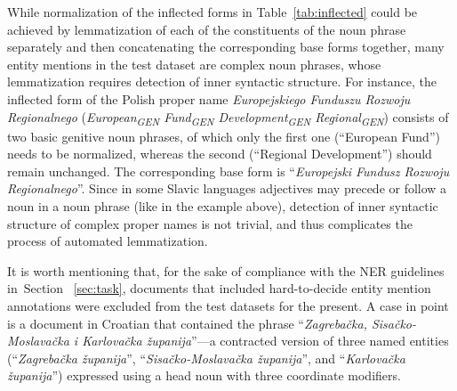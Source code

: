 \documentclass[11pt]{article}
\begin{document}
While normalization of the inflected forms in Table~\ref{tab:inflected} could be achieved
by lemmatization of each of the constituents of the noun phrase separately and then concatenating
the corresponding base forms together, many entity mentions in the test dataset are complex noun phrases, 
whose lemmatization requires detection of inner syntactic structure. For instance, the inflected form 
of the Polish proper name \textit{Europejskiego Funduszu Rozwoju Regionalnego} 
(\emph{European\textsubscript{GEN} Fund\textsubscript{GEN} Development\textsubscript{GEN} Regional\textsubscript{GEN}}) consists of two basic genitive 
noun phrases, of which only the first one (``European Fund'') needs to be normalized, whereas the 
second (``Regional Development'') should remain unchanged. The corresponding base form
is ``\textit{Europejski Fundusz Rozwoju Regionalnego}''. Since in some Slavic languages
adjectives may precede or follow a noun in a noun phrase (like in the example above), 
detection of inner syntactic structure of complex proper names is not trivial, and thus complicates
the process of automated lemmatization.

It is worth mentioning that, for the sake of compliance with the NER guidelines in~Section
~\ref{sec:task}, documents that included hard-to-decide entity mention annotations were
excluded from the test datasets for the present.  {A case in point is a document in Croatian
  that contained the phrase ``\textit{Zagrebačka, Sisačko-Moslavačka i Karlovačka
    županija}''---a contracted version of three named entities (``\textit{Zagrebačka
    županija}'', ``\textit{Sisačko-Moslavačka županija}'', and ``\textit{Karlovačka
    županija}'') expressed using a head noun with three coordinate modifiers.}
\end{document}
